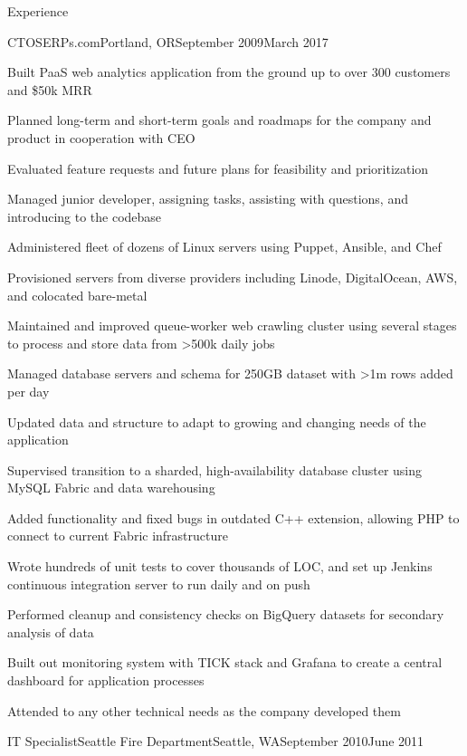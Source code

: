 \documentclass[letterpaper,10pt]{article}
\begin{document}
\begin{res_section}{Experience}
\begin{res_experienceitem}{CTO}{SERPs.com}{Portland, OR}{September 2009}{March 2017}
  \item Built PaaS web analytics application from the ground up to over 300 customers and \$50k MRR
  \item Planned long-term and short-term goals and roadmaps for the company and product in cooperation with CEO
  \item Evaluated feature requests and future plans for feasibility and prioritization
  \item Managed junior developer, assigning tasks, assisting with questions, and introducing to the codebase
  \item Administered fleet of dozens of Linux servers using Puppet, Ansible, and Chef
  \item Provisioned servers from diverse providers including Linode, DigitalOcean, AWS, and colocated bare-metal
  \item Maintained and improved queue-worker web crawling cluster using several stages to process and store data from \textgreater500k daily jobs
  \item Managed database servers and schema for 250GB dataset with \textgreater1m rows added per day
  \item Updated data and structure to adapt to growing and changing needs of the application
  \item Supervised transition to a sharded, high-availability database cluster using MySQL Fabric and data warehousing
  \item Added functionality and fixed bugs in outdated C++ extension, allowing PHP to connect to current Fabric infrastructure
  \item Wrote hundreds of unit tests to cover thousands of LOC, and set up Jenkins continuous integration server to run daily and on push
  \item Performed cleanup and consistency checks on BigQuery datasets for secondary analysis of data
  \item Built out monitoring system with TICK stack and Grafana to create a central dashboard for application processes
  \item Attended to any other technical needs as the company developed them
\end{res_experienceitem}
\begin{res_experienceitem}{IT Specialist}{Seattle Fire Department}{Seattle, WA}{September 2010}{June 2011}

\end{res_experienceitem}
\end{res_section}
\end{document}
